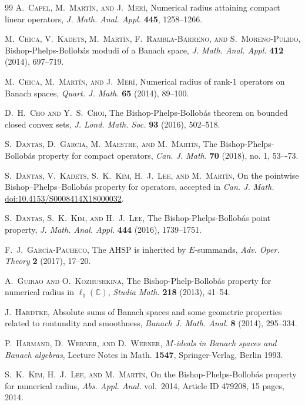 \documentclass[10pt,a4paper]{amsart}
\theoremstyle{plain}
\theoremstyle{definition}
\newcommand{\C}{\mathbb{C}}
\begin{document}
\begin{thebibliography}{99}
 \textsc{A.~Capel, M.~Mart\'in, and J.~Mer\'i}, Numerical radius attaining compact linear operators, \emph{J. Math. Anal. Appl.} \textbf{445}, 1258--1266.
	
 \textsc{M.~Chica, V.~Kadets, M.~Mart\'in, F.~Rambla-Barreno, and S.~Moreno-Pulido}, Bishop-Phelps-Bollob\'as modudi of a Banach space, \emph{J. Math. Anal. Appl.} {\bf 412} (2014), 697--719.

 \textsc{M.~Chica, M.~Mart\'in, and J.~Mer\'i}, Numerical radius of rank-1 operators on Banach spaces, \emph{Quart. J. Math.} {\bf 65} (2014), 89--100.

 \textsc{D.~H.~Cho and Y.~S.~Choi}, The Bishop-Phelps-Bollob\'{a}s theorem on bounded closed convex sets, \emph{J. Lond. Math. Soc.} \textbf{93} (2016),  502--518.

 \textsc{S.~Dantas, D.~Garc\'ia, M.~Maestre, and M.~Mart\'in}, The Bishop-Phelps-Bollob\'as property for compact operators, \emph{Can. J. Math.} \textbf{70} (2018), no. 1, 53–-73.

 \textsc{S.~Dantas, V.~Kadets, S.~K.~Kim, H.~J.~Lee, and M.~Mart\'in}, On the pointwise Bishop--Phelps--Bollob\'as property for operators, accepted in \emph{Can. J. Math.} \href{https://doi.org/10.4153/S0008414X18000032}{doi:10.4153/S0008414X18000032}.

	 \textsc{S.~Dantas, S.~K.~Kim, and H.~J.~Lee}, The Bishop-Phelps-Bollob\'as point property, \emph{J. Math. Anal. Appl.} \textbf{444} (2016), 1739--1751.
	
 \textsc{F.~J.~Garc\'ia-Pacheco}, The AHSP is inherited by $E$-summands, \emph{ Adv. Oper. Theory} \textbf{2} (2017), 17--20.

 \textsc{A.~Guirao and O.~Kozhushkina}, The Bishop-Phelp-Bollob\'as property for numerical radius in $\ell_1(\C)$, \emph{Studia Math.} {\bf 218} (2013), 41--54.

 \textsc{J.~Hardtke}, Absolute sums of Banach spaces and some geometric properties related to rontundity and smoothness,  \emph{Banach J. Math. Anal.} \textbf{8} (2014), 295--334.

 \textsc{P.~Harmand, D.~Werner, and D.~Werner},
\emph{$M$-ideals in Banach spaces and Banach algebras}, Lecture Notes in Math. \textbf{1547}, Springer-Verlag, Berlin 1993.

 \textsc{S.~K.~Kim, H.~J.~Lee, and M.~Mart\'in}, On the Bishop-Phelps-Bollob\'as property for numerical radius, \emph{Abs. Appl. Anal.} vol.~2014, Article ID 479208, 15 pages, 2014.


\end{thebibliography}
\end{document}
